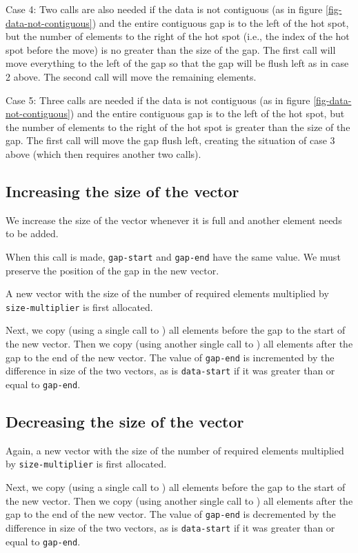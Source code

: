 \documentclass[11pt]{article}
\begin{document}
Case 4: Two calls are also needed if the data is not contiguous (as in
figure \ref{fig-data-not-contiguous}) and the entire contiguous gap is
to the left of the hot spot, but the number of elements to the right
of the hot spot (i.e., the index of the hot spot before the move) is
no greater than the size of the gap.  The first call will move
everything to the left of the gap so that the gap will be flush left
as in case 2 above.  The second call will move the remaining
elements.  

Case 5: Three calls are needed if the data is not contiguous (as in
figure \ref{fig-data-not-contiguous}) and the entire contiguous gap is
to the left of the hot spot, but the number of elements to the right
of the hot spot is greater than the size of the gap.  The first call
will move the gap flush left, creating the situation of case 3 above
(which then requires another two calls).

\subsection{Increasing the size of the vector}

We increase the size of the vector whenever it is full and another
element needs to be added. 

When this call is made, \texttt{gap-start} and \texttt{gap-end} have
the same value.  We must preserve the position of the gap in the new
vector.

A new vector with the size of the number of required elements
multiplied by \texttt{size-multiplier} is first allocated.

Next, we copy (using a single call to ) all elements
before the gap to the start of the new vector.  Then we copy (using
another single call to ) all elements after the gap to the
end of the new vector. The value of \texttt{gap-end} is incremented by
the difference in size of the two vectors, as is \texttt{data-start}
if it was greater than or equal to \texttt{gap-end}. 

\subsection{Decreasing the size of the vector}

Again, a new vector with the size of the number of required elements
multiplied by \texttt{size-multiplier} is first allocated.

Next, we copy (using a single call to ) all elements
before the gap to the start of the new vector.  Then we copy (using
another single call to ) all elements after the gap to the
end of the new vector. The value of \texttt{gap-end} is decremented by
the difference in size of the two vectors, as is \texttt{data-start}
if it was greater than or equal to \texttt{gap-end}. 
\end{document}
